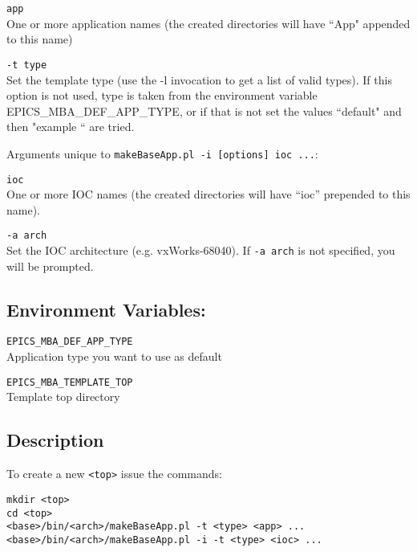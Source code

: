\begin{description}
\item \verb|app| \\
One or more application names (the created directories will have ``App" appended to this name)

\item \verb|-t type| \\
Set the template type (use the -l invocation to get a list of valid types). If this option is not used, type is taken from 
the environment variable EPICS\_MBA\_DEF\_APP\_TYPE, or if that is not set the values ``default" and then 
"example `` are tried.
\end{description}

Arguments unique to \verb|makeBaseApp.pl -i [options] ioc ...|:

\begin{description}
\item \verb|ioc| \\
One or more IOC names (the created directories will have ``ioc'' prepended to this name).

\item \verb|-a arch| \\
Set the IOC architecture (e.g. vxWorks-68040).  If \verb|-a arch| is not specified, you will be prompted.
\end{description}

\subsection{Environment Variables:}

\begin{description}
\item \verb|EPICS_MBA_DEF_APP_TYPE| \\
Application type you want to use as default

\item \verb|EPICS_MBA_TEMPLATE_TOP| \\
Template top directory
\end{description}

\subsection{Description}

To create a new \verb|<top>| issue the commands:

\begin{verbatim}
mkdir <top>
cd <top>
<base>/bin/<arch>/makeBaseApp.pl -t <type> <app> ... 
<base>/bin/<arch>/makeBaseApp.pl -i -t <type> <ioc> ...
\end{verbatim}

